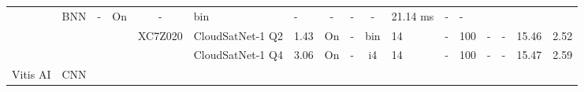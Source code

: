 \begin{table}
\begin{adjustbox}{totalheight=\baselineskip,}
\begin{tabular}{ccccclp{2em}cp{3em}cp{2em}p{4em}p{3em}p{3.5em}p{3.5em}p{2.5em}p{3em}}
                   &\multirow{1}{*}{BNN}
                       &\multirow{1}{*}{-}
                           &\multirow{1}{*}{On}
                               &\multirow{1}{*}{-}
                                   &\multirow{1}{*}{bin}
                                       &\multirow{1}{*}{-}
                                           &\multirow{1}{*}{-}
                                               &\multirow{1}{*}{-}
                                                   &\multirow{1}{*}{-}
                                                       &\multirow{1}{*}{21.14 ms}
                                                           &\multirow{1}{*}{-}
                                                               &\multirow{1}{*}{-}\\
\cmidrule{4-17}
   &   &   &\multirow{2}{*}{\cite{pitonakCloudSatNet1FPGABasedHardwareAccelerated2022}}
               &\multirow{2}{*}{XC7Z020}
                   &\multirow{1}{*}{CloudSatNet-1 Q2}
                       &\multirow{1}{*}{1.43}
                           &\multirow{1}{*}{On}
                               &\multirow{1}{*}{-}
                                   &\multirow{1}{*}{bin}
                                       &\multirow{1}{*}{14}
                                           &\multirow{1}{*}{-}
                                               &\multirow{1}{*}{100}
                                                   &\multirow{1}{*}{-}
                                                       &\multirow{1}{*}{-}
                                                           &\multirow{1}{*}{15.46}
                                                               &\multirow{1}{*}{2.52}\\
   &   &   &   &   &\multirow{1}{*}{CloudSatNet-1 Q4}
                       &\multirow{1}{*}{3.06}
                           &\multirow{1}{*}{On}
                               &\multirow{1}{*}{-}
                                   &\multirow{1}{*}{i4}
                                       &\multirow{1}{*}{14}
                                           &\multirow{1}{*}{-}
                                               &\multirow{1}{*}{100}
                                                   &\multirow{1}{*}{-}
                                                       &\multirow{1}{*}{-}
                                                           &\multirow{1}{*}{15.47}
                                                               &\multirow{1}{*}{2.59}\\
\cmidrule{1-17}
\multirow{12}{*}{Vitis AI}
   &\multirow{12}{*}{CNN}

\end{tabular}
\end{adjustbox}
\end{table}
